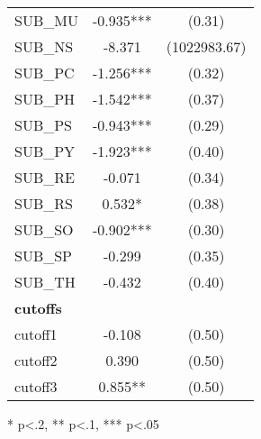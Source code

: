 \begin{table}[htb]
\begin{threeparttable}
\begin{tabular}{l c c}
      SUB\_MU          & -0.935*** & (0.31)       \\
      SUB\_NS          & -8.371    & (1022983.67) \\
      SUB\_PC          & -1.256*** & (0.32)       \\
      SUB\_PH          & -1.542*** & (0.37)       \\
      SUB\_PS          & -0.943*** & (0.29)       \\
      SUB\_PY          & -1.923*** & (0.40)       \\
      SUB\_RE          & -0.071    & (0.34)       \\
      SUB\_RS          & 0.532*    & (0.38)       \\
      SUB\_SO          & -0.902*** & (0.30)       \\
      SUB\_SP          & -0.299    & (0.35)       \\
      SUB\_TH          & -0.432    & (0.40)       \\
      \hline
      \textbf{cutoffs} &           &              \\
      cutoff1          & -0.108    & (0.50)       \\
      cutoff2          & 0.390     & (0.50)       \\
      cutoff3          & 0.855**   & (0.50)       \\
      \hline
      \hline
    \end{tabular}
    \begin{tablenotes}
    \item{* p<.2, ** p<.1, *** p<.05}
    \end{tablenotes}
  \end{threeparttable}
\end{table}

\clearpage{}

\newpage{}

